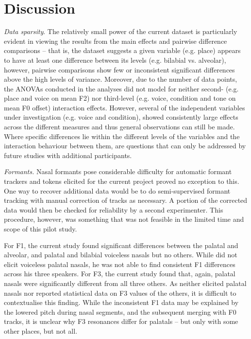 \documentclass[12pt]{article}
\begin{document}
\newpage

\section{Discussion}

\emph{Data sparsity}. The relatively small power of the current dataset is particularly evident in viewing the results from the main effects and pairwise difference comparisons – that is, the dataset suggests a given variable (e.g. place) appears to have at least one difference between its levels (e.g. bilabial vs. alveolar), however, pairwise comparisons show few or inconsistent significant differences above the high levels of variance. Moreover, due to the number of data points, the ANOVAs conducted in the analyses did not model for neither second- (e.g. place and voice on mean F2) nor third-level (e.g. voice, condition and tone on mean F0 offset) interaction effects. However, several of the independent variables under investigation (e.g. voice and condition), showed consistently large effects across the different measures and thus general observations can still be made. Where specific differences lie within the different levels of the variables and the interaction behaviour between them, are questions that can only be addressed by future studies with additional participants. 

\emph{Formants.} Nasal formants pose considerable difficulty for automatic formant trackers and tokens elicited for the current project proved no exception to this. One way to recover additional data would be to do semi-supervised formant tracking with manual correction of tracks as necessary. A portion of the corrected data would then be checked for reliability by a second experimenter. This procedure, however, was something that was not feasible in the limited time and scope of this pilot study.

For F1, the current study found significant differences between the palatal and alveolar, and palatal and bilabial voiceless nasals but no others. While \citep{dantsuji1986some} did not elicit voiceless palatal nasals, he was not able to find consistent F1 differences across his three speakers. For F3, the current study found that, again, palatal nasals were significantly different from all three others. As \citep{dantsuji1986some} neither elicited palatal nasals nor reported statistical data on F3 values of the others, it is difficult to contextualise this finding. While the inconsistent F1 data may be explained by the lowered pitch during nasal segments, and the subsequent merging with F0 tracks, it is unclear why F3 resonances differ for palatals – but only with some other places, but not all.
\end{document}
